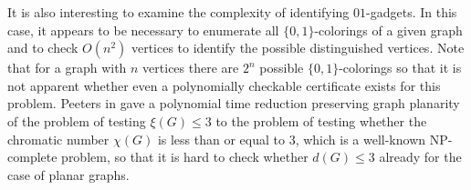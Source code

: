\documentclass[twocolumn, a4paper, superscriptaddress,nofootinbib, accepted=2020-08-07, hyperref]{quantumarticle}
\def\tred{\textcolor{red}}
\newtheorem{lemma}{Lemma}
\begin{document}



%	



It is also interesting to examine the complexity of identifying $01$-gadgets. In this case, it appears to be necessary to enumerate all $\{0,1\}$-colorings of a given graph and to check $O(n^2)$ vertices to identify the possible distinguished vertices. Note that for a graph with $n$ vertices there are $2^n$ possible $\{0,1\}$-colorings so that it is not apparent whether even a polynomially checkable certificate exists for this problem. Peeters  in \cite{P96} gave a polynomial time reduction preserving graph planarity of the problem of testing $\xi(G) \leq 3$ to the problem of testing whether the chromatic number $\chi(G)$ is less than or equal to $3$, which is a well-known NP-complete problem, so that it is hard to check whether $d(G) \leq 3$ already for the case of planar graphs.  
\end{document}
